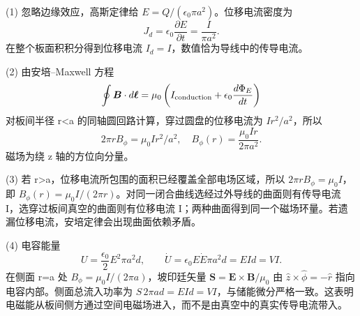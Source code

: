 (1) 忽略边缘效应，高斯定律给 \(E=Q/(\epsilon_0\pi a^2)\)。位移电流密度为
\[
J_d=\epsilon_0\frac{\partial E}{\partial t}
=\frac I{\pi a^2}.
\]
在整个板面积积分得到位移电流 \(I_d=I\)，数值恰为导线中的传导电流。

(2) 由安培–Maxwell 方程
\[
\oint\boldsymbol B\cdot d\boldsymbol\ell
=\mu_0\left(I_{\rm conduction}+\epsilon_0\frac{d\Phi_E}{dt}\right)
\]
对板间半径 r<a 的同轴圆回路计算，穿过圆盘的位移电流为 \(I r^2/a^2\)，所以
\[
2\pi rB_\phi=\mu_0I r^2/a^2,\quad
B_\phi(r)=\frac{\mu_0Ir}{2\pi a^2}.
\]
磁场为绕 z 轴的方位向分量。

(3) 若 r>a，位移电流所包围的面积已经覆盖全部电场区域，所以 \(2\pi rB_\phi=\mu_0I\)，即 \(B_\phi(r)=\mu_0I/(2\pi r)\)。对同一闭合曲线选经过外导线的曲面则有传导电流 I，选穿过板间真空的曲面则有位移电流 I；两种曲面得到同一个磁场环量。若遗漏位移电流，安培定律会出现曲面依赖矛盾。

(4) 电容能量
\[
U=\frac{\epsilon_0}{2}E^2\pi a^2d,\qquad
\dot U=\epsilon_0E\dot E\pi a^2d=EId=VI.
\]
在侧面 r=a 处 \(B_\phi=\mu_0 I/(2\pi a)\)，坡印廷矢量 \(\boldsymbol S=\boldsymbol E\times\boldsymbol B/\mu_0\) 由 \(\hat z\times\hat\phi=-\hat r\) 指向电容内部。侧面总流入功率为 \(S\,2\pi ad=EI d=VI\)，与储能微分严格一致。这表明电磁能从板间侧方通过空间电磁场进入，而不是由真空中的真实传导电流带入。
